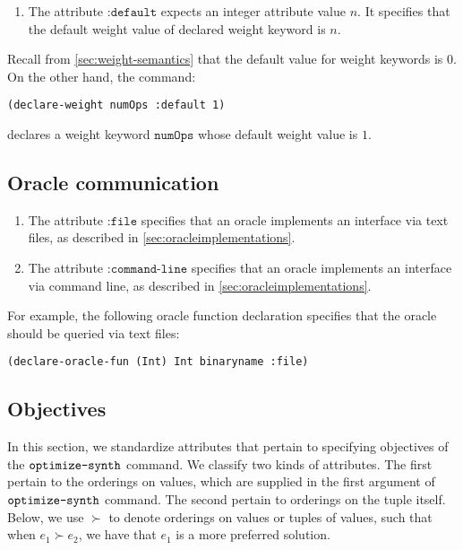 \documentclass[english,a4paper,10pt]{article}
\begin{document}
\begin{enumerate}
\item The attribute $\texttt{:default}$
expects an integer attribute value $n$.
It specifies that the default weight value of declared weight keyword is $n$.
\end{enumerate}
\noindent
Recall from \cref{sec:weight-semantics} that the default value
for weight keywords is $0$.
On the other hand, the command:
\begin{lstlisting}[language=SyGuS-Desugar]
(declare-weight numOps :default 1)
\end{lstlisting}
declares a weight keyword $\texttt{numOps}$ whose default weight value is $1$.

\subsection{Oracle communication}
\label{sec:attr-oracles}
\begin{enumerate}
\item The attribute $\texttt{:file}$
specifies that an oracle implements an interface via text files, as described in \cref{sec:oracleimplementations}.
\item The attribute $\texttt{:command-line}$
specifies that an oracle implements an interface via command line, as described in \cref{sec:oracleimplementations}.
\end{enumerate}

For example, the following oracle function declaration specifies that the oracle should be queried via text files:
\begin{lstlisting}[language=SyGuS-Desugar]
(declare-oracle-fun (Int) Int binaryname :file)
\end{lstlisting}


\subsection{Objectives}%
\label{sec:attr-objectives}

In this section, we standardize attributes that pertain to specifying objectives of the $\texttt{optimize-synth}$ command.
We classify two kinds of attributes.
The first pertain to the orderings on values,
which are supplied in the first argument of $\texttt{optimize-synth}$ command.
The second pertain to orderings on the tuple itself.
Below, we use $\succ$ to denote orderings on values or tuples of values,
such that when $e_1 \succ e_2$, we have that $e_1$ is a more preferred solution.
\end{document}
